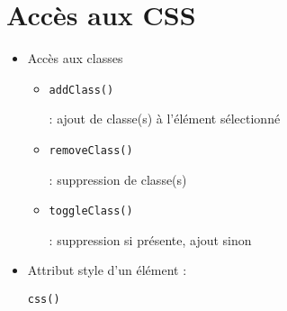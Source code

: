 \hypertarget{accuxe8s-aux-css}{%
\section{Accès aux CSS}\label{accuxe8s-aux-css}}

\begin{itemize}
\tightlist
\item
  Accès aux classes

  \begin{itemize}
  \tightlist
  \item
    \begin{otherlanguage}{english}\texttt{addClass()}\end{otherlanguage}
    : ajout de classe(s) à l'élément sélectionné
  \item
    \begin{otherlanguage}{english}\texttt{removeClass()}\end{otherlanguage}
    : suppression de classe(s)
  \item
    \begin{otherlanguage}{english}\texttt{toggleClass()}\end{otherlanguage}
    : suppression si présente, ajout sinon
  \end{itemize}
\item
  Attribut style d'un élément :
  \begin{otherlanguage}{english}\texttt{css()}\end{otherlanguage}
\end{itemize}

\begin{otherlanguage}{english}

\begin{Shaded}
\end{Shaded}

\end{otherlanguage}

